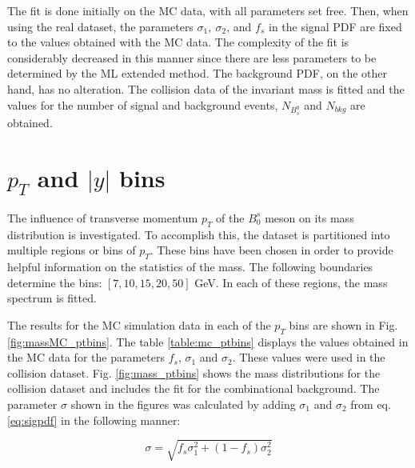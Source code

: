 The fit is done initially on the MC data, with all parameters set free. Then, when using the real dataset, the parameters $\sigma_1, \ \sigma_2$, and $f_s$ in the signal PDF are fixed to the values obtained with the MC data. The complexity of the fit is considerably decreased in this manner since there are less parameters to be determined by the ML extended method. The background PDF, on the other hand, has no alteration. The collision data of the invariant mass is fitted and the values for the number of signal and background events, $N_{B^0_s}$ and $N_{bkg}$ are obtained. 

\section{$p_T$ and $|y|$ bins}

The influence of transverse momentum $p_T$ of the $B_0^s$ meson on its mass distribution is investigated. To accomplish this, the dataset is partitioned into multiple regions or bins of $p_T$. These bins have been chosen in order to provide helpful information on the statistics of the mass. The following boundaries determine the bins: $[7, 10, 15, 20, 50]$ GeV. In each of these regions, the mass spectrum is fitted. 

The results for the MC simulation data in each of the $p_T$ bins are shown in Fig. \ref{fig:massMC_ptbins}. The table \ref{table:mc_ptbins} displays the values obtained in the MC data for the parameters $f_s$, $\sigma_1$ and $\sigma_2$. These values were used in the collision dataset. Fig. \ref{fig:mass_ptbins} shows the mass distributions for the collision dataset and includes the fit for the combinational background. The parameter $\sigma$ shown in the figures was calculated by adding $\sigma_1$ and $\sigma_2$ from eq. \ref{eq:sigpdf} in the following manner:

\begin{equation}
	\sigma = \sqrt{f_s \sigma_1^2 + (1-f_s)\sigma_2^2}
\end{equation}

